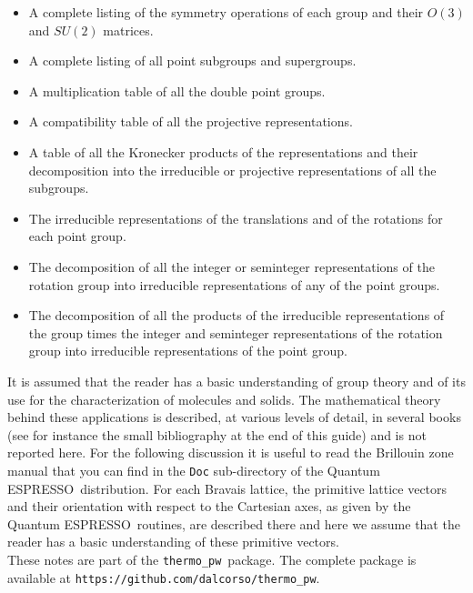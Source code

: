 \documentclass[12pt,a4paper,twoside]{report}
\def\qe{{\sc Quantum ESPRESSO}}
\def\tpw{\texttt{thermo\_pw}}
\begin{document}
\begin{itemize}

\item A complete listing of the symmetry operations of each group
and their $O(3)$ and $SU(2)$ matrices.

\item A complete listing of all point subgroups and supergroups.

\item A multiplication table of all the double point groups.

\item A compatibility table of all the projective representations.

\item A table of all the Kronecker products of the representations and
their decomposition into the irreducible or projective representations
of all the subgroups.

\item The irreducible representations of the translations and of the rotations
for each point group.

\item The decomposition of all the integer or seminteger representations
of the rotation group into irreducible representations of any of the point groups.

\item The decomposition of all the products of the irreducible representations 
of the group times the integer and seminteger representations of the 
rotation group into irreducible representations of the point group.

\end{itemize}
It is assumed that the reader has a basic understanding of group theory and
of its use for the characterization of molecules and solids.
The mathematical theory behind these applications is described, 
at various levels of detail, in several books (see for instance the small 
bibliography at the end of this guide) and is not reported here. 
For the following discussion it is useful to read the Brillouin zone 
manual that you can find in the \texttt{Doc} sub-directory of the 
\qe\ distribution. For each Bravais lattice, the primitive lattice vectors
and their orientation with respect to the Cartesian axes, as given by the
\qe\ routines, are described there and here we assume that the reader has a
basic understanding of these primitive vectors. \\
These notes are part of the \tpw\ package. The complete package is
available at \texttt{https://github.com/dalcorso/thermo\_pw}.
\end{document}
